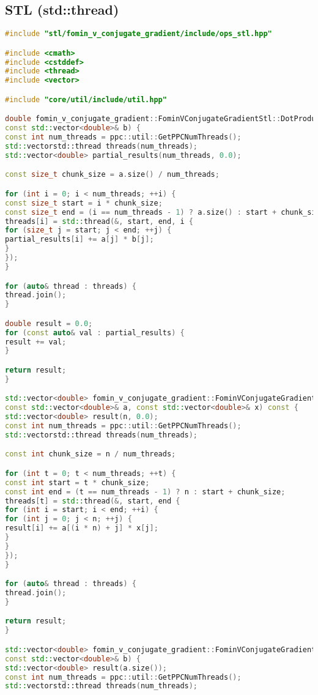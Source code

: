 \documentclass[12pt]{article}
\begin{document}
\subsection*{STL (std::thread)}
\begin{lstlisting}[language=C++]
#include "stl/fomin_v_conjugate_gradient/include/ops_stl.hpp"

#include <cmath>
#include <cstddef>
#include <thread>
#include <vector>

#include "core/util/include/util.hpp"

double fomin_v_conjugate_gradient::FominVConjugateGradientStl::DotProduct(const std::vector<double>& a,
const std::vector<double>& b) {
const int num_threads = ppc::util::GetPPCNumThreads();
std::vectorstd::thread threads(num_threads);
std::vector<double> partial_results(num_threads, 0.0);

const size_t chunk_size = a.size() / num_threads;

for (int i = 0; i < num_threads; ++i) {
const size_t start = i * chunk_size;
const size_t end = (i == num_threads - 1) ? a.size() : start + chunk_size;
threads[i] = std::thread(&, start, end, i {
for (size_t j = start; j < end; ++j) {
partial_results[i] += a[j] * b[j];
}
});
}

for (auto& thread : threads) {
thread.join();
}

double result = 0.0;
for (const auto& val : partial_results) {
result += val;
}

return result;
}

std::vector<double> fomin_v_conjugate_gradient::FominVConjugateGradientStl::MatrixVectorMultiply(
const std::vector<double>& a, const std::vector<double>& x) const {
std::vector<double> result(n, 0.0);
const int num_threads = ppc::util::GetPPCNumThreads();
std::vectorstd::thread threads(num_threads);

const int chunk_size = n / num_threads;

for (int t = 0; t < num_threads; ++t) {
const int start = t * chunk_size;
const int end = (t == num_threads - 1) ? n : start + chunk_size;
threads[t] = std::thread(&, start, end {
for (int i = start; i < end; ++i) {
for (int j = 0; j < n; ++j) {
result[i] += a[(i * n) + j] * x[j];
}
}
});
}

for (auto& thread : threads) {
thread.join();
}

return result;
}

std::vector<double> fomin_v_conjugate_gradient::FominVConjugateGradientStl::VectorAdd(const std::vector<double>& a,
const std::vector<double>& b) {
std::vector<double> result(a.size());
const int num_threads = ppc::util::GetPPCNumThreads();
std::vectorstd::thread threads(num_threads);


\end{lstlisting}
\end{document}

